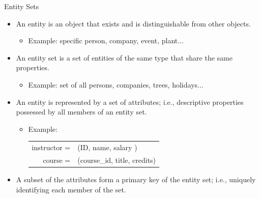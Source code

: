 \documentclass{beamer}
\begin{document}
\begin{frame}{Entity Sets}
    \begin{itemize}
        \item An entity is an object that exists and is distinguishable from other objects.
        \begin{itemize}
            \item Example: specific person, company, event, plant...
        \end{itemize}
        \item An entity set is a set of entities of the same type that share the same properties.
        \begin{itemize}
            \item Example: set of all persons, companies, trees, holidays...
        \end{itemize}
        \item An entity is represented by a set of attributes; i.e., descriptive properties possessed by all members of an entity set.
        \begin{itemize}
            \item Example: \\
            \begin{tabular}{r l}
                instructor = & (ID, name, salary ) \\
                    course = & (course\_id, title, credits)\\
            \end{tabular}
        \end{itemize}
        \item A subset of the attributes form a primary key of the entity set; i.e., uniquely identifying each member of the set.
    \end{itemize}
\end{frame}
\end{document}
